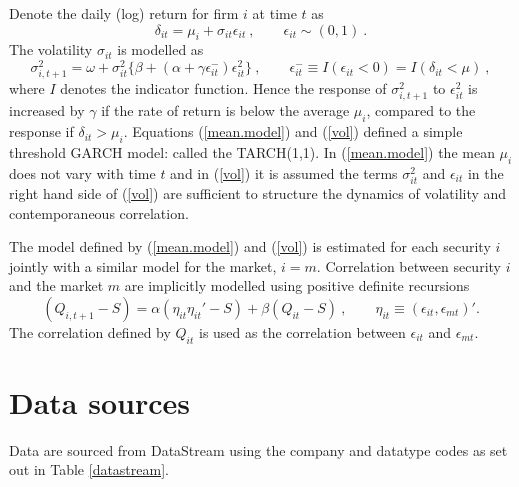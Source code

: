 \documentclass[12pt]{article}
\newcommand{\eps}{\epsilon}
\newcommand{\eref}[1]{(\ref{#1})}
\newcommand{\tref}[1]{Table \ref{#1}}
\newcommand{\cq}{\ , \qquad}
\newcommand{\be}[1]{\begin{equation}\label{#1}}
\newcommand{\ee}{\end{equation}}
\begin{document}
Denote the daily (log) return for firm $i$ at time $t$ as
\newcommand{\vareps}{\varepsilon}
\be{mean.model}
\delta_{it}=\mu_i+\sigma_{it}\eps_{it}\cq \eps_{it}\sim (0,1)\ .
\ee
The volatility $\sigma_{it}$ is modelled as
\be{vol}
\sigma_{i,t+1}^2 = \omega+ \sigma^2_{it}\{\beta+(\alpha+\gamma \eps^-_{it})\eps_{it}^2\}  \cq  \eps^-_{it}\equiv I(\eps_{it}<0)=I(\delta_{it}<\mu)\ ,
\ee
where $I$ denotes the indicator function.  Hence the response of $\sigma_{i,t+1}^2$ to $\eps_{it}^2$  is increased by $\gamma$   if
the rate of return is below the average $\mu_i$, compared to the response if $\delta_{it}>\mu_i$.  Equations \eref{mean.model} and \eref{vol} defined a simple threshold GARCH model:  called the TARCH(1,1).   In \eref{mean.model} the mean $\mu_i$ does not vary with time $t$ and in \eref{vol} it is assumed the terms  $\sigma_{it}^2$ and $\eps_{it}$ in the right hand side of \eref{vol} are sufficient to structure the dynamics of volatility and contemporaneous correlation.

The model defined by \eref{mean.model} and \eref{vol} is estimated  for each security $i$ jointly with  a similar model for  the market,  $i=m$.   Correlation between security $i$ and the market $m$ are implicitly modelled using  positive definite recursions   \citep{engle2002dynamic}
$$
(Q_{i,t+1}-S) = \alpha (\eta_{it}\eta_{it}'-S) + \beta (Q_{it}-S)\cq \eta_{it}\equiv(\eps_{it},\eps_{mt})' .
$$
The correlation defined by $Q_{it}$ is used as the correlation between $\eps_{it}$ and $\eps_{mt}$.


\section{Data sources}\label{data}

Data are sourced from DataStream using the company and datatype codes as set out in \tref{datastream}.
\end{document}
